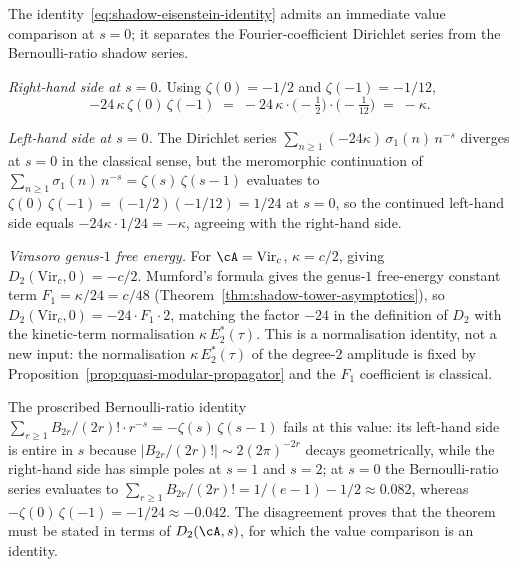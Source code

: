 \begin{remark}[The value at $s = 0$ separates the two Dirichlet series;
\ClaimStatusProvedHere]
\label{rem:shadow-eisenstein-numerical-check}
The identity~\eqref{eq:shadow-eisenstein-identity} admits
an immediate value comparison at $s = 0$; it separates the
Fourier-coefficient Dirichlet series from the Bernoulli-ratio
shadow series.

\emph{Right-hand side at $s = 0$.}\enspace
Using $\zeta(0) = -1/2$ and
$\zeta(-1) = -1/12$,
\[
 -24\,\kappa\,\zeta(0)\,\zeta(-1)
 \;=\;
 -24\,\kappa \cdot \bigl(-\tfrac{1}{2}\bigr)
 \cdot \bigl(-\tfrac{1}{12}\bigr)
 \;=\;
 -\kappa.
\]

\emph{Left-hand side at $s = 0$.}\enspace
The Dirichlet series
$\sum_{n \ge 1} (-24\kappa)\,\sigma_1(n)\,n^{-s}$
diverges at $s = 0$ in the classical sense, but the
meromorphic continuation of
$\sum_{n \ge 1} \sigma_1(n)\,n^{-s} = \zeta(s)\,\zeta(s-1)$
evaluates to $\zeta(0)\,\zeta(-1)
= (-1/2)(-1/12) = 1/24$ at $s = 0$, so the continued
left-hand side equals $-24\kappa \cdot 1/24 = -\kappa$,
agreeing with the right-hand side.

\emph{Virasoro genus-$1$ free energy.}\enspace
For $\cA = \mathrm{Vir}_c$, $\kappa = c/2$, giving
$D_2(\mathrm{Vir}_c, 0) = -c/2$. Mumford's formula gives
the genus-$1$ free-energy constant term
$F_1 = \kappa/24 = c/48$
(Theorem~\ref{thm:shadow-tower-asymptotics}), so
$D_2(\mathrm{Vir}_c, 0) = -24\cdot F_1 \cdot 2$, matching
the factor $-24$ in the definition of $D_2$ with the
kinetic-term normalisation $\kappa\,E_2^*(\tau)$. This is
a normalisation identity, not a new input: the normalisation
$\kappa\,E_2^*(\tau)$ of the degree-$2$ amplitude is
fixed by Proposition~\ref{prop:quasi-modular-propagator}
and the $F_1$ coefficient is classical.

The proscribed Bernoulli-ratio identity
$\sum_{r \ge 1} B_{2r}/(2r)! \cdot r^{-s}
= -\zeta(s)\,\zeta(s-1)$
fails at this value: its left-hand side is entire
in $s$ because $|B_{2r}/(2r)!| \sim 2(2\pi)^{-2r}$
decays geometrically, while the right-hand side has simple
poles at $s = 1$ and $s = 2$; at $s = 0$ the Bernoulli-ratio
series evaluates to $\sum_{r \ge 1} B_{2r}/(2r)!
= 1/(e - 1) - 1/2 \approx 0.082$, whereas
$-\zeta(0)\,\zeta(-1) = -1/24 \approx -0.042$. The
disagreement proves that the theorem must be stated in terms of
$D_2(\cA, s)$, for which the value comparison is an identity.
\end{remark}

